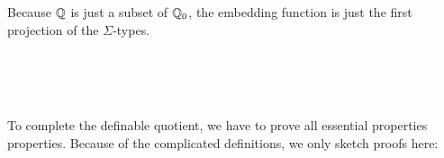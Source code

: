 \begin{code}\>\<%
\\
\>\AgdaFunction{[\_]} \AgdaSymbol{:}   \<%
\\
\>\AgdaFunction{[} \AgdaSymbol{(}\AgdaInductiveConstructor{+} \AgdaSymbol{)}   \AgdaFunction{]} \AgdaSymbol{=}   \AgdaSymbol{(} \AgdaSymbol{)}  \AgdaSymbol{())}\<%
\\
\>\AgdaFunction{[} \AgdaSymbol{(} \AgdaSymbol{)}   \AgdaFunction{]} \AgdaSymbol{=} \AgdaFunction{-}  \AgdaSymbol{(} \AgdaSymbol{)} \AgdaSymbol{(} \AgdaSymbol{)}  \AgdaSymbol{())}\<%
\\
\>\<\end{code}

Because $\mathbb{Q}$ is just a subset of $\mathbb{Q}_0$, the embedding function is just the first projection of the $\Sigma$-types.

\begin{code}\>\<%
\\
\> \AgdaSymbol{:}   \<%
\\
\> \AgdaSymbol{=} \<%
\\
\>\<\end{code}

To complete the definable quotient, we have to prove all essential properties
properties. Because of the complicated definitions, we only sketch proofs here:

